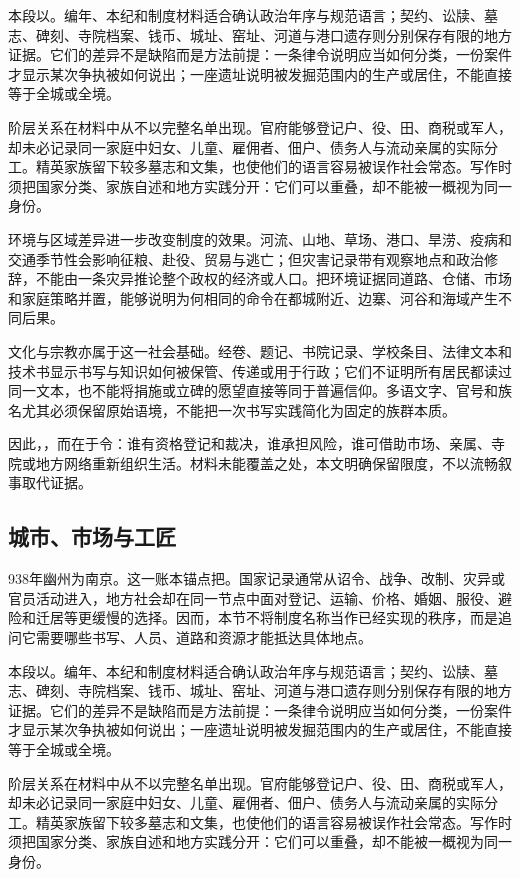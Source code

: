 本段以。编年、本纪和制度材料适合确认政治年序与规范语言；契约、讼牍、墓志、碑刻、寺院档案、钱币、城址、窑址、河道与港口遗存则分别保存有限的地方证据。它们的差异不是缺陷而是方法前提：一条律令说明应当如何分类，一份案件才显示某次争执被如何说出；一座遗址说明被发掘范围内的生产或居住，不能直接等于全城或全境。

阶层关系在材料中从不以完整名单出现。官府能够登记户、役、田、商税或军人，却未必记录同一家庭中妇女、儿童、雇佣者、佃户、债务人与流动亲属的实际分工。精英家族留下较多墓志和文集，也使他们的语言容易被误作社会常态。写作时须把国家分类、家族自述和地方实践分开：它们可以重叠，却不能被一概视为同一身份。

环境与区域差异进一步改变制度的效果。河流、山地、草场、港口、旱涝、疫病和交通季节性会影响征粮、赴役、贸易与逃亡；但灾害记录带有观察地点和政治修辞，不能由一条灾异推论整个政权的经济或人口。把环境证据同道路、仓储、市场和家庭策略并置，能够说明为何相同的命令在都城附近、边寨、河谷和海域产生不同后果。

文化与宗教亦属于这一社会基础。经卷、题记、书院记录、学校条目、法律文本和技术书显示书写与知识如何被保管、传递或用于行政；它们不证明所有居民都读过同一文本，也不能将捐施或立碑的愿望直接等同于普遍信仰。多语文字、官号和族名尤其必须保留原始语境，不能把一次书写实践简化为固定的族群本质。

因此，，而在于令：谁有资格登记和裁决，谁承担风险，谁可借助市场、亲属、寺院或地方网络重新组织生活。材料未能覆盖之处，本文明确保留限度，不以流畅叙事取代证据。

\subsection{城市、市场与工匠}

938年幽州为南京。这一账本锚点把。国家记录通常从诏令、战争、改制、灾异或官员活动进入，地方社会却在同一节点中面对登记、运输、价格、婚姻、服役、避险和迁居等更缓慢的选择。因而，本节不将制度名称当作已经实现的秩序，而是追问它需要哪些书写、人员、道路和资源才能抵达具体地点。

本段以。编年、本纪和制度材料适合确认政治年序与规范语言；契约、讼牍、墓志、碑刻、寺院档案、钱币、城址、窑址、河道与港口遗存则分别保存有限的地方证据。它们的差异不是缺陷而是方法前提：一条律令说明应当如何分类，一份案件才显示某次争执被如何说出；一座遗址说明被发掘范围内的生产或居住，不能直接等于全城或全境。

阶层关系在材料中从不以完整名单出现。官府能够登记户、役、田、商税或军人，却未必记录同一家庭中妇女、儿童、雇佣者、佃户、债务人与流动亲属的实际分工。精英家族留下较多墓志和文集，也使他们的语言容易被误作社会常态。写作时须把国家分类、家族自述和地方实践分开：它们可以重叠，却不能被一概视为同一身份。

